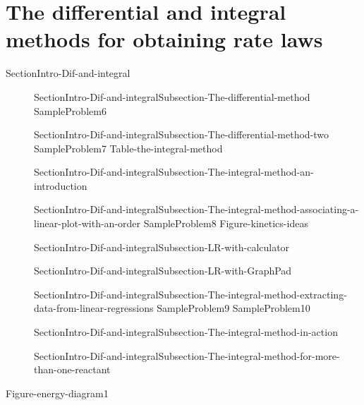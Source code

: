 \documentclass[main.tex]{subfiles}
\begin{document}
\section{The differential and integral methods for obtaining rate laws}{SectionIntro-Dif-and-integral}
\sloppy \begin{description}
\item[] {SectionIntro-Dif-and-integralSubsection-The-differential-method}
  {SampleProblem6}
\item[] {SectionIntro-Dif-and-integralSubsection-The-differential-method-two}
  {SampleProblem7}
  {Table-the-integral-method}
 \item[] {SectionIntro-Dif-and-integralSubsection-The-integral-method-an-introduction}
\item[] {SectionIntro-Dif-and-integralSubsection-The-integral-method-associating-a-linear-plot-with-an-order}
  {SampleProblem8}
  {Figure-kinetics-ideas}

\item[] {SectionIntro-Dif-and-integralSubsection-LR-with-calculator}
\item[] {SectionIntro-Dif-and-integralSubsection-LR-with-GraphPad}




\item[] {SectionIntro-Dif-and-integralSubsection-The-integral-method-extracting-data-from-linear-regressions}
  {SampleProblem9}
  {SampleProblem10}
\item[] {SectionIntro-Dif-and-integralSubsection-The-integral-method-in-action}
\item[] {SectionIntro-Dif-and-integralSubsection-The-integral-method-for-more-than-one-reactant}
\end{description}
  {Figure-energy-diagram1}
\end{document}
